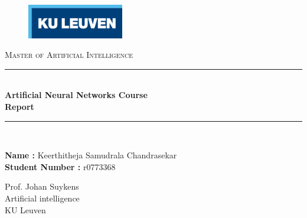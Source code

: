 \documentclass[12pt]{report}
\newcommand{\HRule}{\rule{\linewidth}{0.5mm}}
\begin{document}
	\vspace{5 cm}
	\begin{figure}
		\vspace*{1cm}
		\begin{flushright}
			\includegraphics[height=15mm]{KU Leuven logo}
		\end{flushright}
	\end{figure}
	
	\begin{center}
		\vspace*{0.7cm}
		\textsc{\LARGE Master of Artificial Intelligence}\\[1.0cm]
		\vspace*{1cm}
		\HRule \\[0.4cm]
		{ \huge \bfseries Artificial Neural Networks Course}\\[0.3cm] 
		{ \huge \bfseries Report}\\[0.3cm] 
		\HRule \\[1.5cm]
	\end{center}
	
	\begin{minipage}{0.5\textwidth}
		\vspace*{3cm}
		\begin{flushleft} \large
			{\bf Name :} Keerthitheja Samudrala Chandrasekar\\
			{\bf Student Number :} r0773368
		\end{flushleft}
	\end{minipage}
	\begin{minipage}{0.4\textwidth}
		\vspace*{3cm}
		\begin{flushright} \large
			Prof. Johan Suykens \\
			Artificial intelligence\\
			KU Leuven
			
		\end{flushright}
	\end{minipage}\\[2cm]
	\newpage
	\tableofcontents
	\newpage

	
	
	
	
\end{document}
